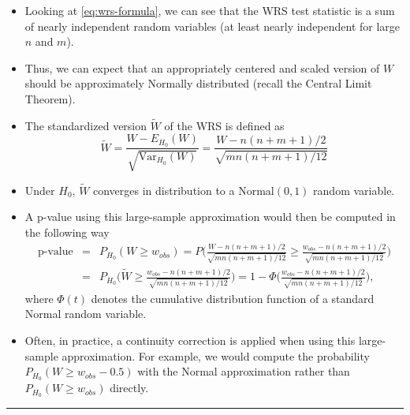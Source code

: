 \documentclass[]{book}
\begin{document}
\begin{itemize}
\item
  Looking at \eqref{eq:wrs-formula}, we can see that the
  WRS test statistic is a sum of nearly independent random variables
  (at least nearly independent for large \(n\) and \(m\)).
\item
  Thus, we can expect that an appropriately centered and scaled
  version of \(W\) should be approximately Normally distributed (recall the Central Limit Theorem).
\item
  The standardized version \(\tilde{W}\) of the WRS is defined as
  \begin{equation}
  \tilde{W} = \frac{W - E_{H_{0}}(W)}{ \sqrt{\textrm{Var}_{H_{0}}(W) }  }
  = \frac{W - n(n+m+1)/2}{ \sqrt{ mn(n + m + 1)/12 }  }
  \end{equation}
\item
  Under \(H_{0}\), \(\tilde{W}\) converges in distribution to a Normal\((0,1)\) random variable.
\item
  A p-value using this large-sample approximation would then be computed in the following
  way
  \begin{eqnarray}
  \textrm{p-value} &=& P_{H_{0}}( W \geq w_{obs}) 
  = P\Bigg( \frac{W - n(n+m+1)/2}{ \sqrt{ mn(n + m + 1)/12 }  } \geq \frac{w_{obs} - n(n+m+1)/2}{ \sqrt{ mn(n + m + 1)/12 }  }\Bigg)
  \nonumber \\
  &=& P_{H_{0}}\Big( \tilde{W} \geq \frac{w_{obs} - n(n+m+1)/2}{ \sqrt{ mn(n + m + 1)/12 }  }\Big)
  = 1 - \Phi\Bigg( \frac{w_{obs} - n(n+m+1)/2}{ \sqrt{ mn(n + m + 1)/12 }  }  \Bigg), \nonumber
  \end{eqnarray}
  where \(\Phi(t)\) denotes the cumulative distribution function of a standard Normal random variable.
\item
  Often, in practice, a continuity correction is applied when using this large-sample approximation.
  For example, we would compute the probability \(P_{H_{0}}(W \geq w_{obs} - 0.5)\) with the Normal approximation
  rather than \(P_{H_{0}}(W \geq w_{obs})\) directly.
\end{itemize}

\begin{center}\rule{0.5\linewidth}{\linethickness}\end{center}
\end{document}
